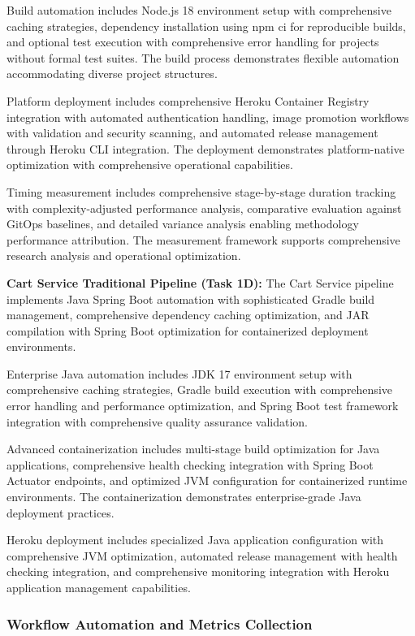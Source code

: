 Build automation includes Node.js 18 environment setup with comprehensive caching strategies, dependency installation using npm ci for reproducible builds, and optional test execution with comprehensive error handling for projects without formal test suites. The build process demonstrates flexible automation accommodating diverse project structures.

Platform deployment includes comprehensive Heroku Container Registry integration with automated authentication handling, image promotion workflows with validation and security scanning, and automated release management through Heroku CLI integration. The deployment demonstrates platform-native optimization with comprehensive operational capabilities.

Timing measurement includes comprehensive stage-by-stage duration tracking with complexity-adjusted performance analysis, comparative evaluation against GitOps baselines, and detailed variance analysis enabling methodology performance attribution. The measurement framework supports comprehensive research analysis and operational optimization.

\textbf{Cart Service Traditional Pipeline (Task 1D):}
The Cart Service pipeline implements Java Spring Boot automation with sophisticated Gradle build management, comprehensive dependency caching optimization, and JAR compilation with Spring Boot optimization for containerized deployment environments.

Enterprise Java automation includes JDK 17 environment setup with comprehensive caching strategies, Gradle build execution with comprehensive error handling and performance optimization, and Spring Boot test framework integration with comprehensive quality assurance validation.

Advanced containerization includes multi-stage build optimization for Java applications, comprehensive health checking integration with Spring Boot Actuator endpoints, and optimized JVM configuration for containerized runtime environments. The containerization demonstrates enterprise-grade Java deployment practices.

Heroku deployment includes specialized Java application configuration with comprehensive JVM optimization, automated release management with health checking integration, and comprehensive monitoring integration with Heroku application management capabilities.

\subsubsection{Workflow Automation and Metrics Collection}


